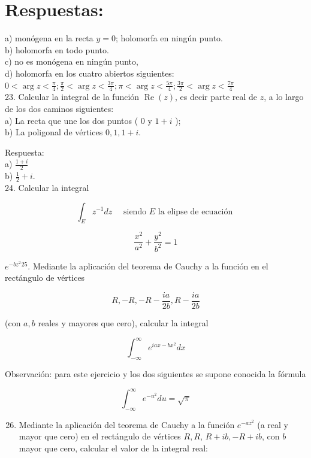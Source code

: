 \documentclass[10pt]{article}
\theoremstyle{plain}
\theoremstyle{definition}
\theoremstyle{remark}
\begin{document}
\section*{Respuestas:}
a) monógena en la recta $y=0$; holomorfa en ningún punto.\\
b) holomorfa en todo punto.\\
c) no es monógena en ningún punto,\\
d) holomorfa en los cuatro abiertos siguientes:\\
$0<\arg z<\frac{\pi}{4} ; \frac{\pi}{2}<\arg z<\frac{3 \pi}{4} ; \pi<\arg z<\frac{5 \pi}{4} ; \frac{3 \pi}{2}<\arg z<\frac{7 \pi}{4}$\\
23. Calcular la integral de la función $\operatorname{Re}(z)$, es decir parte real de $z$, a lo largo de los dos caminos siguientes:\\
a) La recta que une los dos puntos ( 0 y $1+i$ );\\
b) La poligonal de vértices $0,1,1+i$.

Respuesta:\\
a) $\frac{1+i}{2}$\\
b) $\frac{1}{2}+i$.\\
24. Calcular la integral

$$
\int_{E} z^{-1} d z \quad \text { siendo } E \text { la elipse de ecuación }
$$

$$
\frac{x^{2}}{a^{2}}+\frac{y^{2}}{b^{2}}=1
$$

$e^{-b z^{2}}{ }^{25}$. Mediante la aplicación del teorema de Cauchy a la función en el rectángulo de vértices

$$
R,-R,-R-\frac{i a}{2 b}, R-\frac{i a}{2 b}
$$

(con $a, b$ reales y mayores que cero), calcular la integral

$$
\int_{-\infty}^{\infty} e^{i a x-b x^{2}} d x
$$

Observación: para este ejercicio y los dos siguientes se supone conocida la fórmula

$$
\int_{-\infty}^{\infty} e^{-u^{2}} d u=\sqrt{\pi}
$$

\begin{enumerate}
  \setcounter{enumi}{25}
  \item Mediante la aplicación del teorema de Cauchy a la función $e^{-a z^{2}}$ (a real y mayor que cero) en el rectángulo de vértices $R, R$, $R+i b,-R+i b$, con $b$ mayor que cero, calcular el valor de la integral real:
\end{enumerate}
\end{document}
